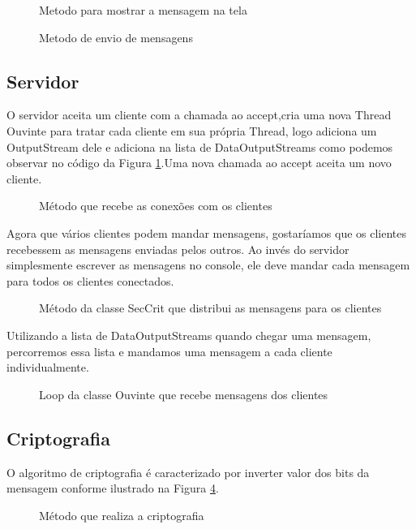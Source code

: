 \documentclass[a4paper,12pt]{article}
\begin{document}
\begin{figure}[H]

\caption{Metodo para mostrar a mensagem na tela}
\end{figure}

\begin{figure}[H]

\caption{Metodo de envio de mensagens}
\end{figure}

\subsection{Servidor}
O servidor aceita um cliente com a chamada ao accept,cria uma nova Thread Ouvinte para tratar cada cliente em sua própria Thread, logo adiciona um OutputStream dele e adiciona na lista de DataOutputStreams como podemos observar no código da Figura \ref{fig7}.Uma nova chamada ao accept aceita um novo cliente.
\begin{figure}[H]

\caption{Método que recebe as conexões com os clientes}
\label{fig7}
\end{figure}
Agora que vários clientes podem mandar mensagens, gostaríamos que os clientes recebessem as mensagens enviadas pelos outros. Ao invés do servidor simplesmente escrever as mensagens no console, ele deve mandar cada mensagem para todos os clientes conectados.
\begin{figure}[H]
	
	\caption{Método da classe SecCrit que distribui as mensagens para os clientes}
	\label{fig8}
\end{figure}

Utilizando a lista de DataOutputStreams quando chegar uma mensagem, percorremos essa lista e mandamos uma mensagem a cada cliente individualmente.
\begin{figure}[H]

\caption{Loop da classe Ouvinte que recebe mensagens dos clientes}
\label{fig10}
\end{figure}


\subsection{Criptografia}
O algoritmo de criptografia é caracterizado por inverter valor dos bits da mensagem conforme ilustrado na Figura \ref{fig9}.
\begin{figure}[H]

\caption{Método que realiza a criptografia}
\label{fig9}
\end{figure}
\end{document}
